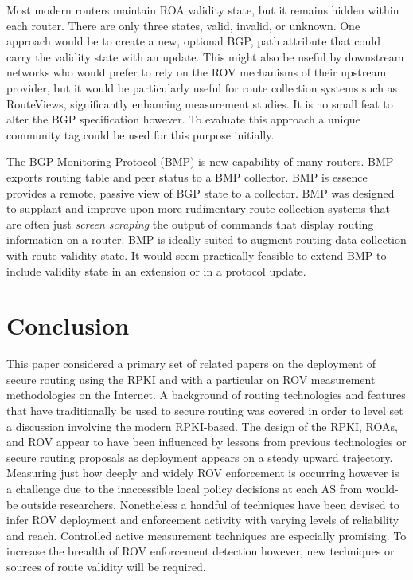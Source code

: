 \documentclass[sigconf]{acmart}
\begin{document}
Most modern routers maintain ROA validity state, but it remains hidden
within each router.  There are only three states, valid, invalid, or
unknown.  One approach would be to create a new, optional BGP, path
attribute that could carry the validity state with an update.  This
might also be useful by downstream networks who would prefer to rely on
the ROV mechanisms of their upstream provider, but it would be
particularly useful for route collection systems such as RouteViews,
significantly enhancing measurement studies.  It is no small feat to
alter the BGP specification however.  To evaluate this approach
a unique community tag could be used for this purpose initially.

The BGP Monitoring Protocol (BMP) is new capability of many
routers.\cite{scudder_bgp_2016} BMP exports routing table and peer
status to a BMP collector.  BMP is essence provides a remote, passive
view of BGP state to a collector.  BMP was designed to supplant and
improve upon more rudimentary route collection systems that are often
just \emph{screen scraping} the output of commands that display routing
information on a router.  BMP is ideally suited to augment routing data
collection with route validity state.  It would seem practically
feasible to extend BMP to include validity state in an extension or in a
protocol update.

\section{Conclusion}\label{sec:Conclusion}

This paper considered a primary set of related papers on the deployment
of secure routing using the RPKI and with a particular on ROV
measurement methodologies on the Internet.  A background of routing
technologies and features that have traditionally be used to secure
routing was covered in order to level set a discussion involving the
modern RPKI-based.  The design of the RPKI, ROAs, and ROV appear to have
been influenced by lessons from previous technologies or secure routing
proposals as deployment appears on a steady upward trajectory.
Measuring just how deeply and widely ROV enforcement is occurring however
is a challenge due to the inaccessible local policy decisions at each AS
from would-be outside researchers.  Nonetheless a handful of techniques
have been devised to infer ROV deployment and enforcement activity with
varying levels of reliability and reach.  Controlled active measurement
techniques are especially promising.  To increase the breadth of ROV
enforcement detection however, new techniques or sources of route
validity will be required.
\end{document}
